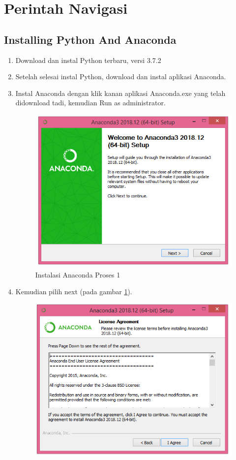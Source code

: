 \section{Perintah Navigasi}

\subsection{Installing Python And Anaconda}
\begin{enumerate}
  \item Download dan instal Python terbaru, versi 3.7.2
  \item Setelah selesai instal Python, download dan instal aplikasi Anaconda.
  \item Instal Anaconda dengan klik kanan aplikasi Anaconda.exe yang telah didownload tadi, kemudian Run as administrator. 
      \begin{figure}[!ht]
	  \centering
	  \includegraphics[scale=0.4]{figures/instal/1.PNG}
	  \caption{Instalasi Anaconda Proses 1}
	  \label{labelgambar2}
	  \end{figure}
  \item Kemudian pilih next (pada gambar \ref{labelgambar2}).
	 \begin{figure}[h]
	  \centering
	  \includegraphics[scale=0.4]{figures/instal/2.PNG}

\end{figure}
\end{enumerate}
